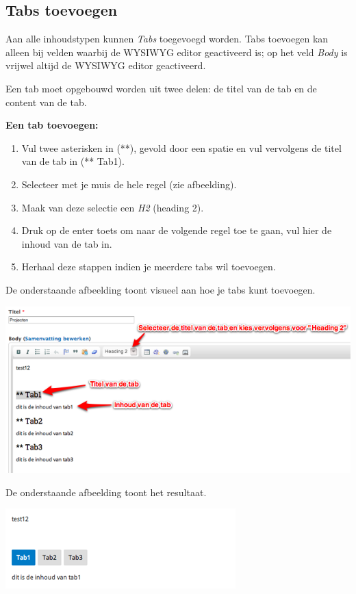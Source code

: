 \subsection{Tabs toevoegen}\label{tabstoevoegen}
Aan alle inhoudstypen kunnen \emph{Tabs} toegevoegd worden. 
Tabs toevoegen kan alleen bij velden waarbij de WYSIWYG  editor geactiveerd is; op het veld \emph{Body} is vrijwel altijd de WYSIWYG editor geactiveerd.

Een tab moet opgebouwd worden uit twee delen: de titel van de tab en de content van de tab.

\textbf{Een tab toevoegen:} 

\begin{enumerate}
\item Vul twee asterisken in (**), gevold door een spatie en vul vervolgens de titel van de tab in (** Tab1).
\item Selecteer met je muis de hele regel (zie afbeelding).
\item Maak van deze selectie een \emph{H2} (heading 2).
\item Druk op de enter toets om naar de volgende regel toe te gaan, vul hier de inhoud van de tab in.
\item Herhaal deze stappen indien je meerdere tabs wil toevoegen.
\end{enumerate}

De onderstaande afbeelding toont visueel aan hoe je tabs kunt toevoegen.

\begin{center}
	\includegraphics[width=\textwidth]{img/tabs1}
\end{center}

De onderstaande afbeelding toont het resultaat.

\begin{center}
	\includegraphics[width=\textwidth]{img/tabs2}
\end{center}